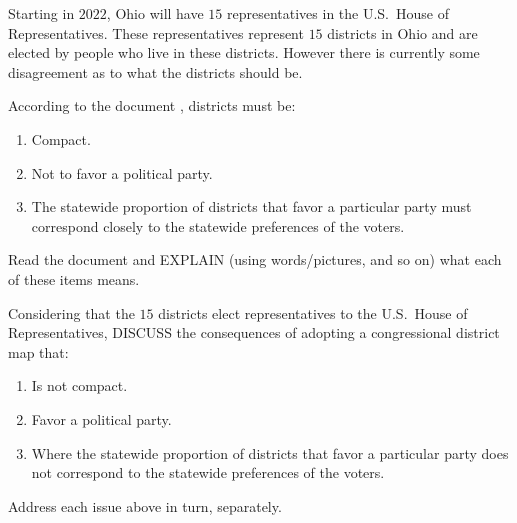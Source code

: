 \documentclass[noauthor,nooutcomes,hints,handout]{ximera}
\begin{document}
\begin{question}
  Starting in $2022$, Ohio will have $15$ representatives in the
  U.S.\ House of Representatives. These representatives represent $15$
  districts in Ohio and are elected by people who live in these
  districts. However there is currently some disagreement as to what
  the districts should be.

  According to the document , districts must be:
  \begin{enumerate}
  \item Compact.
  \item Not to favor a political party.
  \item The statewide proportion of districts that favor a particular
    party must correspond closely to the statewide preferences of the
    voters.
  \end{enumerate}
  Read the document  and EXPLAIN (using words/pictures, and so on) what each of these items means. 
\end{question}


\mynewpage

\begin{question}
  Considering that the $15$ districts elect representatives to the
  U.S.\ House of Representatives, DISCUSS the consequences of adopting
  a congressional district map that:
  \begin{enumerate}
  \item Is not compact.
  \item Favor a political party.
  \item Where the statewide proportion of districts that favor a
    particular party does not correspond to the statewide preferences
    of the voters.
  \end{enumerate}
  Address each issue above in turn, separately. 
\end{question}
\end{document}
